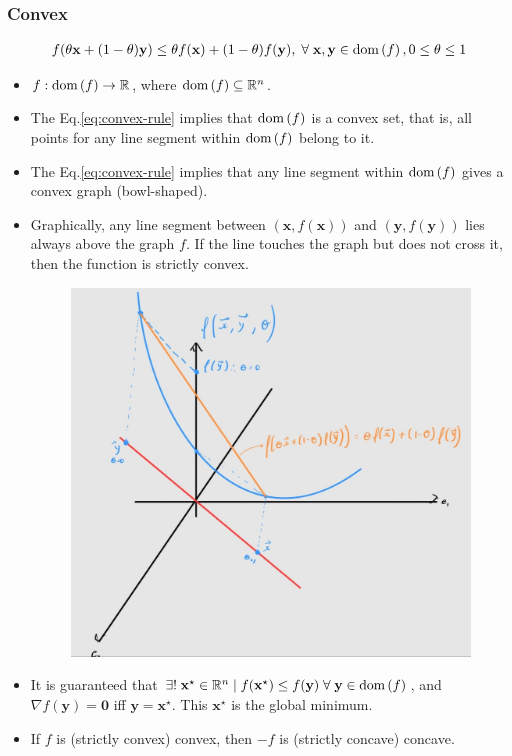 \documentclass{article}
\newcommand{\dom}[1]{\ensuremath{\textnormal{dom}\left(#1\right)}} %
\begin{document}
\subsubsection{Convex}
\begin{align}
	f(\theta\mathbf{x}+(1-\theta)\mathbf{y}) \leq \theta f(\mathbf{x}) + (1-\theta)f(\mathbf{y}),\;\forall\; \mathbf{x}, \mathbf{y} \in \dom{f}, 0\leq\theta\leq 1
	\label{eq:convex-rule}
\end{align}
\begin{itemize}
	\item \(f: \dom{f} \rightarrow \mathbb{R}\), where \(\dom{f} \subseteq \mathbb{R}^{n}\).
	\item The Eq.\eqref{eq:convex-rule} implies that \(\dom{f}\) is a convex set, that is, all points for any line segment within \(\dom{f}\) belong to it.
	\item The Eq.\eqref{eq:convex-rule} implies that any line segment within \(\dom{f}\) gives a convex graph (bowl-shaped).
	\item Graphically, any line segment between \((\mathbf{x}, f(\mathbf{x}))\) and \((\mathbf{y}, f(\mathbf{y}))\) lies always above the graph \(f\). If the line touches the graph but does not cross it, then the function is strictly convex.
	      \begin{figure}[H]
		      \centering
		      \includegraphics[scale=.2]{figs/convex.png}
	      \end{figure}
	\item It is guaranteed that \(\exists!\; \mathbf{x}^{\star} \in \mathbb{R}^{n} \mid f(\mathbf{x}^{\star}) \leq f(\mathbf{y})\;\forall\;\mathbf{y}\in\dom{f}\), and \(\nabla f(\mathbf{y}) = \mathbf{0}\) iff \(\mathbf{y} = \mathbf{x}^{\star}\). This \(\mathbf{x}^{\star}\) is the global minimum.
	\item If \(f\) is (strictly convex) convex, then \(-f\) is (strictly concave) concave.
\end{itemize}
\end{document}
